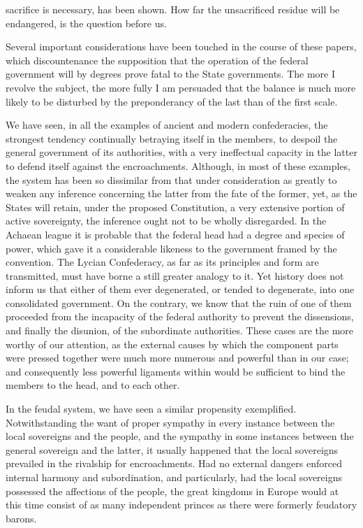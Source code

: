 sacrifice is necessary, has been shown. How far the unsacrificed residue will be endangered, is the question before us.

Several important considerations have been touched in the course of these papers, which discountenance the supposition that the operation of the federal government will by degrees prove fatal to the State governments. The more I revolve the subject, the more fully I am persuaded that the balance is much more likely to be disturbed by the preponderancy of the last than of the first scale.

We have seen, in all the examples of ancient and modern confederacies, the strongest tendency continually betraying itself in the members, to despoil the general government of its authorities, with a very ineffectual capacity in the latter to defend itself against the encroachments. Although, in most of these examples, the system has been so dissimilar from that under consideration as greatly to weaken any inference concerning the latter from the fate of the former, yet, as the States will retain, under the proposed Constitution, a very extensive portion of active sovereignty, the inference ought not to be wholly disregarded. In the Achaean league it is probable that the federal head had a degree and species of power, which gave it a considerable likeness to the government framed by the convention. The Lycian Confederacy, as far as its principles and form are transmitted, must have borne a still greater analogy to it. Yet history does not inform us that either of them ever degenerated, or tended to degenerate, into one consolidated government. On the contrary, we know that the ruin of one of them proceeded from the incapacity of the federal authority to prevent the dissensions, and finally the disunion, of the subordinate authorities. These cases are the more worthy of our attention, as the external causes by which the component parts were pressed together were much more numerous and powerful than in our case; and consequently less powerful ligaments within would be sufficient to bind the members to the head, and to each other.

In the feudal system, we have seen a similar propensity exemplified. Notwithstanding the want of proper sympathy in every instance between the local sovereigns and the people, and the sympathy in some instances between the general sovereign and the latter, it usually happened that the local sovereigns prevailed in the rivalship for encroachments. Had no external dangers enforced internal harmony and subordination, and particularly, had the local sovereigns possessed the affections of the people, the great kingdoms in Europe would at this time consist of as many independent princes as there were formerly feudatory barons.

